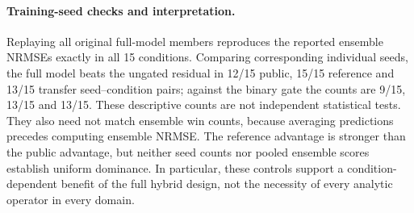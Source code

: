 \paragraph{Training-seed checks and interpretation.}
Replaying all original full-model members reproduces the reported ensemble
NRMSEs exactly in all 15 conditions. Comparing corresponding individual seeds,
the full model beats the ungated residual in 12/15 public, 15/15 reference and
13/15 transfer seed--condition pairs; against the binary gate the counts are
9/15, 13/15 and 13/15. These descriptive counts are not independent statistical
tests. They also need not match ensemble win counts, because averaging
predictions precedes computing ensemble NRMSE. The reference advantage is
stronger than the public advantage, but neither seed counts nor pooled
ensemble scores establish uniform dominance. In particular, these controls
support a condition-dependent benefit of the full hybrid design, not the
necessity of every analytic operator in every domain.
